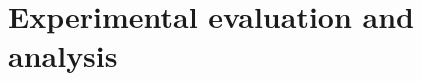 \documentclass[a4paper,fleqn]{cas-dc}
\begin{document}
		
		
		
		
		
		
		





\section{Experimental evaluation and analysis}\label{sec:experiments}
\end{document}
